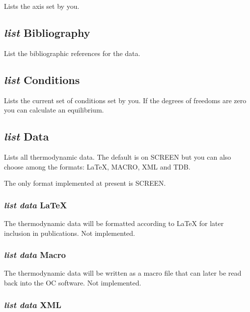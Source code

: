 \documentclass[11pt]{article}
\begin{document}
Lists the axis set by you.

\hypertarget{List biblio}{}
\subsection{{\em list} Bibliography}

List the bibliographic references for the data.

\hypertarget{List conditions}{}
\subsection{{\em list} Conditions}

Lists the current set of conditions set by you.  If the degrees
of freedoms are zero you can calculate an equilibrium.

\hypertarget{Output format for screen}{}
\hypertarget{Output format}{}
\hypertarget{List data}{}
\subsection{{\em list} Data}

Lists all thermodynamic data.  The default is on SCREEN but you can
also choose among the formats: LaTeX, MACRO, XML and TDB.

The only format implemented at present is SCREEN.

\hypertarget{List data LaTeX}{}
\subsubsection{{\em list data} LaTeX}

The thermodynamic data will be formatted according to LaTeX for later
inclusion in publications.  Not implemented.

\hypertarget{List data macro}{}
\subsubsection{{\em list data} Macro}

The thermodynamic data will be written as a macro file that can later
be read back into the OC software.  Not implemented.

\hypertarget{List data XML}{}
\subsubsection{{\em list data} XML}
\end{document}
